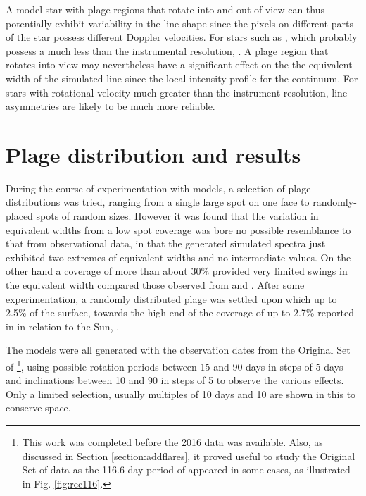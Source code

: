 A model star with plage regions that rotate into and out of view can thus potentially exhibit variability in the line
shape since the pixels on different parts of the star possess different Doppler velocities. For stars such as \prox,
which probably possess a {\vsini} much less than the instrumental resolution, . A plage region
that rotates into view may nevertheless have a significant effect on the the equivalent width of the simulated line
since the local intensity profile for {\ha}  the
continuum. For stars with rotational velocity much greater than the instrument resolution, line asymmetries are likely
to be much more reliable.

\section{Plage distribution and results}
\protect\label{section:plagedists}

During the course of experimentation with models, a selection of plage distributions was tried, ranging from a single
large spot on one face to randomly-placed spots of random sizes.  However it was found that the variation in equivalent widths from a low spot coverage was
bore no possible resemblance to that from observational data, in that the generated simulated spectra just exhibited two
extremes of equivalent widths and no intermediate values. On the other hand a coverage of more than about 30\% provided
very limited swings in the equivalent width compared those observed from {\harps} and {\uves}. After some
experimentation, a randomly distributed plage was settled upon which  up to 2.5\% of the surface,
towards the high end of the coverage of up to 2.7\% reported in \citet{guttenbrunner14} in relation to the Sun,
.

The models were all generated with the observation dates from the Original Set of {\harps}\footnote{This work was
  completed before the 2016 data was available. Also, as discussed in Section \ref{section:addflares}, it proved useful
  to study the Original Set of data as the 116.6 day period of \citet[Table 3]{suarezmascareno15} appeared in some
  cases, as illustrated in Fig. \ref{fig:rec116}.}, using possible rotation periods between 15 and 90 days in steps of 5
days and inclinations between 10{\degree} and 90{\degree} in steps of 5{\degree} to observe the various effects. Only a
limited selection, usually multiples of 10 days and 10{\degree} are shown in this {\paperorthesis} to conserve space.

